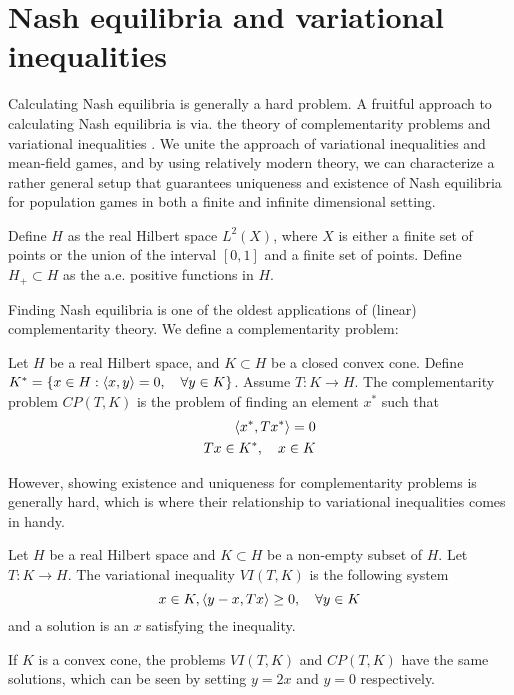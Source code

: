 \section{Nash equilibria and variational inequalities}
Calculating Nash equilibria is generally a hard problem. A fruitful approach to calculating Nash equilibria is via. the theory of complementarity problems and variational inequalities \citep{karamardian complementarity articles variational}. We unite the approach of variational inequalities and mean-field games, and by using relatively modern theory, we can characterize a rather general setup that guarantees uniqueness and existence of Nash equilibria for population games in both a finite and infinite dimensional setting.
\begin{definition}
  Define $H$ as the real Hilbert space $L^2(X)$, where $X$ is either a finite set of points or the union of the interval $[0,1]$ and a finite set of points. Define $H_+ \subset H$ as the a.e. positive functions in $H$.
\end{definition}
Finding Nash equilibria is one of the oldest applications of (linear) complementarity theory. We define a complementarity problem:
\begin{definition}
  Let $H$ be a real Hilbert space, and $K \subset H$ be a closed convex cone. Define $K^* = \{ x \in H : \left \langle x,y \right \rangle = 0, \quad \forall y\in K\} $. Assume $T:K \to H$. The complementarity problem $CP(T,K)$ is the problem of finding an element $x^*$ such that
  \begin{equation}
    \begin{split}
    \left \langle x^*,Tx^* \right \rangle = 0 \\
    Tx \in K^*, \quad  x\in K
  \end{split}
  \end{equation}
\end{definition}
However, showing existence and uniqueness for complementarity problems is generally hard, which is where their relationship to variational inequalities comes in handy.
\begin{definition}
  Let $H$ be a real Hilbert space and $K\subset H$ be a non-empty subset of $H$. Let $T: K \to H$. The variational inequality $VI(T,K)$ is the following system
  \begin{equation}
    x \in K, \left \langle y-x,Tx \right \rangle \geq 0, \quad \forall y \in K
  \end{equation}
  and a solution is an $x$ satisfying the inequality.
\end{definition}
If $K$ is a convex cone, the problems $VI(T,K)$ and $CP(T,K)$ have the same solutions, which can be seen by setting $y=2x$ and $y=0$ respectively.

